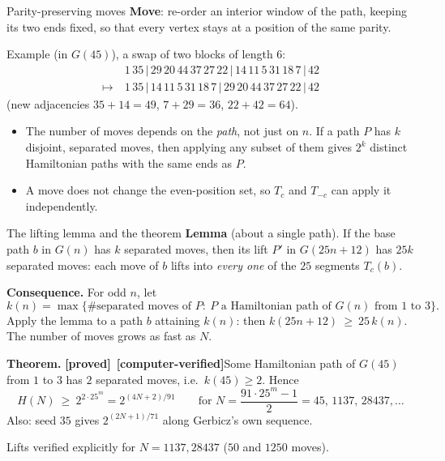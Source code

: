 \documentclass[11pt,aspectratio=169]{beamer}
\newcommand{\Ham}{H}
\newcommand{\proved}{\textcolor{green!50!black}{\textbf{[proved]}}}
\newcommand{\computed}{\textcolor{blue!70!black}{\textbf{[computer-verified]}}}
\begin{document}
\begin{frame}{Parity-preserving moves}
\textbf{Move}: re-order an interior window of the path, keeping its two ends fixed,
so that every vertex stays at a position of the same parity.

\medskip
Example (in $G(45)$), a swap of two blocks of length 6:
\[
\begin{aligned}
&1\,35\,|\,29\,20\,44\,37\,27\,22\,|\,14\,11\,5\,31\,18\,7\,|\,42\\
\longmapsto\ &1\,35\,|\,14\,11\,5\,31\,18\,7\,|\,29\,20\,44\,37\,27\,22\,|\,42
\end{aligned}
\]
(new adjacencies $35+14=49$, $7+29=36$, $22+42=64$).

\medskip
\begin{itemize}
\item The number of moves depends on the \emph{path}, not just on $n$. If a path $P$
 has $k$ disjoint, separated moves, then applying any subset of them gives $2^k$ distinct
 Hamiltonian paths with the same ends as $P$.
\item A move does not change the even-position set, so $T_c$ and $T_{-c}$ can apply it independently.
\end{itemize}
\end{frame}

\begin{frame}{The lifting lemma and the theorem}
\small
\textbf{Lemma} (about a single path). If the base path $b$ in $G(n)$ has $k$ separated
moves, then its lift $P'$ in $G(25n+12)$ has $25k$ separated moves: each move of $b$ lifts
into \emph{every one} of the $25$ segments $T_c(b)$.

\medskip
\textbf{Consequence.} For odd $n$, let
\[
k(n)=\max\{\#\text{separated moves of }P:\ P \text{ a Hamiltonian path of } G(n) \text{ from } 1 \text{ to } 3\}.
\]
Apply the lemma to a path $b$ attaining $k(n)$: then $k(25n+12)\ \ge\ 25\,k(n)$. The number of
moves grows as fast as $N$.

\medskip
\textbf{Theorem.} \proved\ \computed\quad Some Hamiltonian path of $G(45)$ from $1$ to $3$ has $2$ separated moves, i.e.\ $k(45)\ge2$. Hence
\[
\Ham(N)\ \ge\ 2^{2\cdot 25^m}=2^{(4N+2)/91}\qquad\text{for } N=\frac{91\cdot 25^m-1}{2}=45,\,1137,\,28437,\dots
\]
Also: seed $35$ gives $2^{(2N+1)/71}$ along Gerbicz's own sequence.

\medskip
{\small Lifts verified explicitly for $N=1137, 28437$ ($50$ and $1250$ moves).}
\end{frame}
\end{document}
